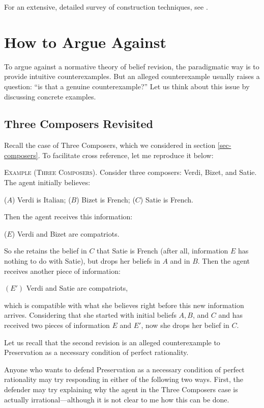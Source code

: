 \ed For an extensive, detailed survey of construction techniques, see \citet*{rodrigues2011belief}.



\section{How to Argue Against}\label{sec-argue-against}

To argue against a normative theory of belief revision, the paradigmatic way is to provide intuitive counterexamples. But an alleged counterexample usually raises a question: ``is that a genuine counterexample?'' Let us think about this issue by discussing concrete examples.

\subsection{Three Composers Revisited}

Recall the case of Three Composers, which we considered in section \ref{sec-composers}. To facilitate cross reference, let me reproduce it below:\op
 
	\xm \textsc{Example (Three Composers).} Consider three composers: Verdi, Bizet, and Satie. The agent initially believes: \op

		\xm ($A$) Verdi is Italian;
		\xm ($B$) Bizet is French;
		\xm ($C$) Satie is French. 

	\ed Then the agent receives this information: \op

		\xm ($E$) Verdi and Bizet are compatriots. 

	\ed So she retains the belief in $C$ that Satie is French (after all, information $E$ has nothing to do with Satie), but drops her beliefs in $A$ and in $B$. Then the agent receives another piece of information: \op

	\xm $(E')$ Verdi and Satie are compatriots,

	\ed which is compatible with what she believes right before this new information arrives. Considering that she started with initial beliefs $A, B$, and $C$ and has received two pieces of information $E$ and $E'$, now she drops her belief in $C$. 

\ed Let us recall that the second revision is an alleged counterexample to Preservation as a necessary condition of perfect rationality. 

Anyone who wants to defend Preservation as a necessary condition of perfect rationality may try responding in either of the following two ways. First, the defender may try explaining why the agent in the Three Composers case is actually irrational---although it is not clear to me how this can be done.

